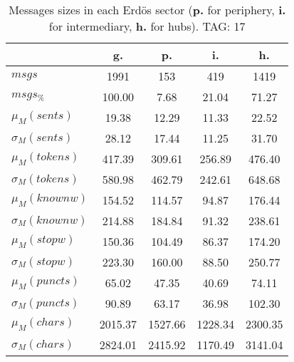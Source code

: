 \begin{table}[h!]
\begin{center}
\begin{tabular}{| l || c | c | c | c |}\hline
 & {\bf g.} & {\bf p.} & {\bf i.} & {\bf h.} \\\hline\hline
$msgs$ & 1991  & 153  & 419  & 1419 \\
$msgs_{\%}$ & 100.00  & 7.68  & 21.04  & 71.27 \\\hline
$\mu_M(sents)$ & 19.38  & 12.29  & 11.33  & 22.52 \\
$\sigma_M(sents)$ & 28.12  & 17.44  & 11.25  & 31.70 \\\hline
$\mu_M(tokens)$ & 417.39  & 309.61  & 256.89  & 476.40 \\
$\sigma_M(tokens)$ & 580.98  & 462.79  & 242.61  & 648.68 \\\hline
$\mu_M(knownw)$ & 154.52  & 114.57  & 94.87  & 176.44 \\
$\sigma_M(knownw)$ & 214.88  & 184.84  & 91.32  & 238.61 \\\hline
$\mu_M(stopw)$ & 150.36  & 104.49  & 86.37  & 174.20 \\
$\sigma_M(stopw)$ & 223.30  & 160.00  & 88.50  & 250.77 \\\hline
$\mu_M(puncts)$ & 65.02  & 47.35  & 40.69  & 74.11 \\
$\sigma_M(puncts)$ & 90.89  & 63.17  & 36.98  & 102.30 \\\hline
$\mu_M(chars)$ & 2015.37  & 1527.66  & 1228.34  & 2300.35 \\
$\sigma_M(chars)$ & 2824.01  & 2415.92  & 1170.49  & 3141.04 \\\hline
\end{tabular}
\caption{Messages sizes in each Erd\"os sector ({{\bf p.}} for periphery, {{\bf i.}} for intermediary, {{\bf h.}} for hubs). TAG: 17}
\end{center}
\end{table}